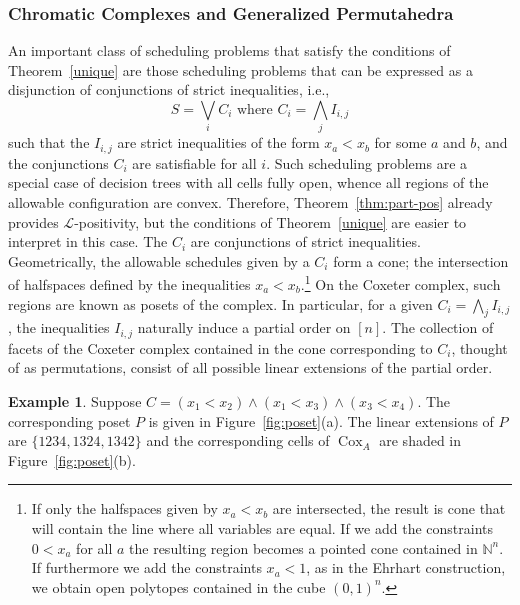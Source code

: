 \documentclass[12pt,reqno]{amsart}
\numberwithin{definition}{section}
\theoremstyle{definition}
\newtheorem{example}[definition]{Example}
\newcommand{\NN}{\mathbb{N}}
\newcommand{\cox}{\operatorname{Cox}}
\newcommand{\ncL}{\mathcal{L}}
\begin{document}
\subsubsection{Chromatic Complexes and Generalized Permutahedra}
An important class of scheduling problems that satisfy the conditions of Theorem~\ref{unique} are those scheduling problems that can be expressed as a disjunction of conjunctions of strict inequalities, i.e.,
\[
  S = \bigvee_i C_i \text{ where } C_i = \bigwedge_j I_{i,j}
\]
such that the $I_{i,j}$ are strict inequalities of the form $x_a <
x_b$ for some $a$ and $b$, and the conjunctions $C_i$ are satisfiable
for all $i$. Such
scheduling problems are a special case of
decision trees with all cells fully open, whence all regions of the allowable configuration are convex. Therefore, Theorem~\ref{thm:part-pos} already
provides $\ncL$-positivity, but the conditions of
Theorem~\ref{unique} are easier to interpret in this case.  The
$C_i$ are conjunctions of strict inequalities. Geometrically, the
allowable schedules given by a $C_i$ form a cone; the intersection of
halfspaces defined by the inequalities $x_a < x_b$.\footnote{If only the halfspaces given by $x_a < x_b$ are intersected, the result is cone that will contain the line where all variables are equal. If we add the constraints $0<x_a$ for all $a$ the resulting region becomes a pointed cone contained in $\NN^n$. If furthermore we add the constraints $x_a<1$, as in the Ehrhart construction, we obtain open polytopes contained in the cube $(0,1)^n$.}  On the Coxeter
complex, such regions are known as posets of the complex.  In particular, for a given $C_i =
\bigwedge_j I_{i,j}$, the inequalities $I_{i,j}$ naturally induce a
partial order on $[n]$.  The collection of facets of the Coxeter
complex contained in the cone corresponding to $C_i$, thought of as
permutations, consist of all possible linear extensions of the partial
order. 


\begin{example}
Suppose $C = (x_1 < x_2) \wedge (x_1 < x_3) \wedge (x_3 < x_4)$.  The corresponding poset $P$ is given in Figure~\ref{fig:poset}(a).  The linear extensions of $P$ are $\{1234, 1324, 1342\}$ and the corresponding cells of $\cox_A$ are shaded in Figure~\ref{fig:poset}(b).
\end{example}
\end{document}

